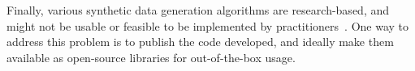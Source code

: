 Finally, various synthetic data generation algorithms are research-based, and
might not be usable or feasible to be implemented by
practitioners~\cite{bayer2021survey}. One way to address this problem is to
publish the code developed, and ideally make them available as open-source
libraries for out-of-the-box usage.


